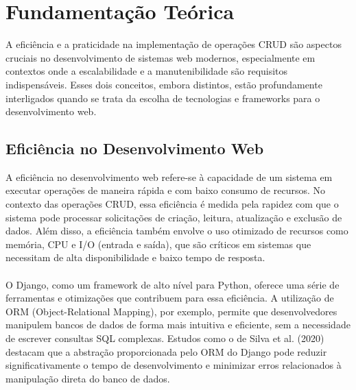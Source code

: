 \documentclass[11pt]{article} %
\begin{document}
\maketitle \section{Fundamentação Teórica}
A eficiência e a praticidade na implementação de operações CRUD são aspectos cruciais no desenvolvimento de sistemas web modernos, especialmente em contextos onde a escalabilidade e a manutenibilidade são requisitos indispensáveis. Esses dois conceitos, embora distintos, estão profundamente interligados quando se trata da escolha de tecnologias e frameworks para o desenvolvimento web.

\subsection{Eficiência no Desenvolvimento Web}
A eficiência no desenvolvimento web refere-se à capacidade de um sistema em executar operações de maneira rápida e com baixo consumo de recursos. No contexto das operações CRUD, essa eficiência é medida pela rapidez com que o sistema pode processar solicitações de criação, leitura, atualização e exclusão de dados. Além disso, a eficiência também envolve o uso otimizado de recursos como memória, CPU e I/O (entrada e saída), que são críticos em sistemas que necessitam de alta disponibilidade e baixo tempo de resposta. 
\\\\
O Django, como um framework de alto nível para Python, oferece uma série de ferramentas e otimizações que contribuem para essa eficiência. A utilização de ORM (Object-Relational Mapping), por exemplo, permite que desenvolvedores manipulem bancos de dados de forma mais intuitiva e eficiente, sem a necessidade de escrever consultas SQL complexas. Estudos como o de Silva et al. (2020) destacam que a abstração proporcionada pelo ORM do Django pode reduzir significativamente o tempo de desenvolvimento e minimizar erros relacionados à manipulação direta do banco de dados.
\end{document}
